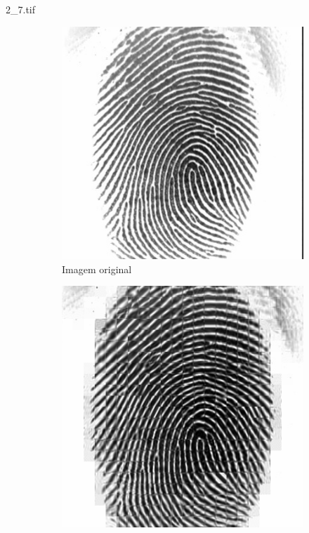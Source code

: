 \documentclass{beamer}
\begin{document}
    \begin{frame}{2\_7.tif}
        \begin{figure}
            \centering
            \begin{subfigure}[!ht]{0.32\textwidth}
                \includegraphics[width=\columnwidth]{Fingerprints/2_7.jpg}
                \caption{Imagem original}
            \end{subfigure}
            \begin{subfigure}[!ht]{0.32\textwidth}
                \includegraphics[width=\columnwidth]{Fingerprints/2_7_intermediate.jpg}

\end{subfigure}
\end{figure}
\end{frame}
\end{document}
